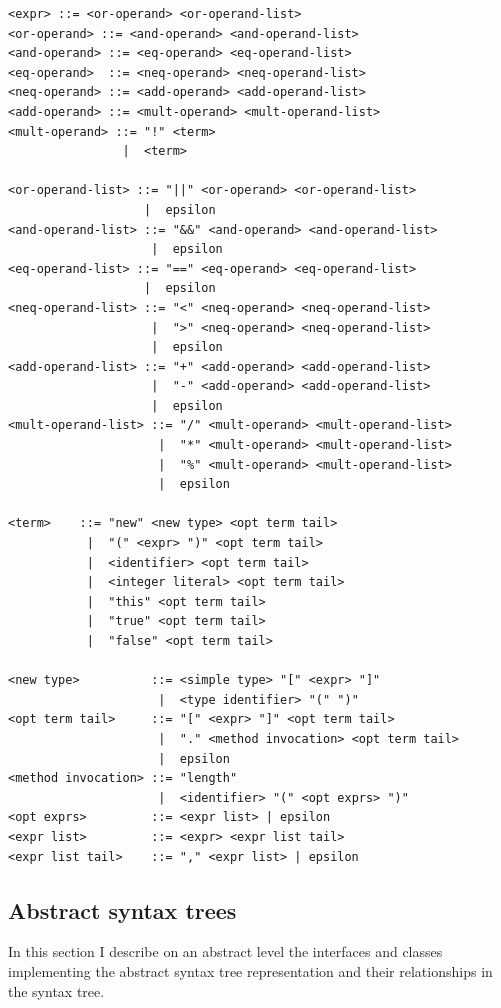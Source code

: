 \documentclass[a4paper,11pt]{article}
\begin{document}
\begin{verbatim}
<expr> ::= <or-operand> <or-operand-list>
<or-operand> ::= <and-operand> <and-operand-list>
<and-operand> ::= <eq-operand> <eq-operand-list>
<eq-operand>  ::= <neq-operand> <neq-operand-list>
<neq-operand> ::= <add-operand> <add-operand-list>
<add-operand> ::= <mult-operand> <mult-operand-list>
<mult-operand> ::= "!" <term>
                |  <term>

<or-operand-list> ::= "||" <or-operand> <or-operand-list>
                   |  epsilon
<and-operand-list> ::= "&&" <and-operand> <and-operand-list>
                    |  epsilon
<eq-operand-list> ::= "==" <eq-operand> <eq-operand-list>
                   |  epsilon
<neq-operand-list> ::= "<" <neq-operand> <neq-operand-list>
                    |  ">" <neq-operand> <neq-operand-list>
                    |  epsilon
<add-operand-list> ::= "+" <add-operand> <add-operand-list>
                    |  "-" <add-operand> <add-operand-list>
                    |  epsilon
<mult-operand-list> ::= "/" <mult-operand> <mult-operand-list>
                     |  "*" <mult-operand> <mult-operand-list>
                     |  "%" <mult-operand> <mult-operand-list>
                     |  epsilon

<term>    ::= "new" <new type> <opt term tail>
           |  "(" <expr> ")" <opt term tail>
           |  <identifier> <opt term tail>
           |  <integer literal> <opt term tail>
           |  "this" <opt term tail>
           |  "true" <opt term tail>
           |  "false" <opt term tail>

<new type>          ::= <simple type> "[" <expr> "]"
                     |  <type identifier> "(" ")"
<opt term tail>     ::= "[" <expr> "]" <opt term tail>
                     |  "." <method invocation> <opt term tail>
                     |  epsilon
<method invocation> ::= "length"
                     |  <identifier> "(" <opt exprs> ")"
<opt exprs>         ::= <expr list> | epsilon
<expr list>         ::= <expr> <expr list tail>
<expr list tail>    ::= "," <expr list> | epsilon

\end{verbatim}

\newpage

\subsection{Abstract syntax trees}

In this section I describe on an abstract level the interfaces and classes implementing the abstract syntax tree representation and their relationships in the syntax tree.
\end{document}
